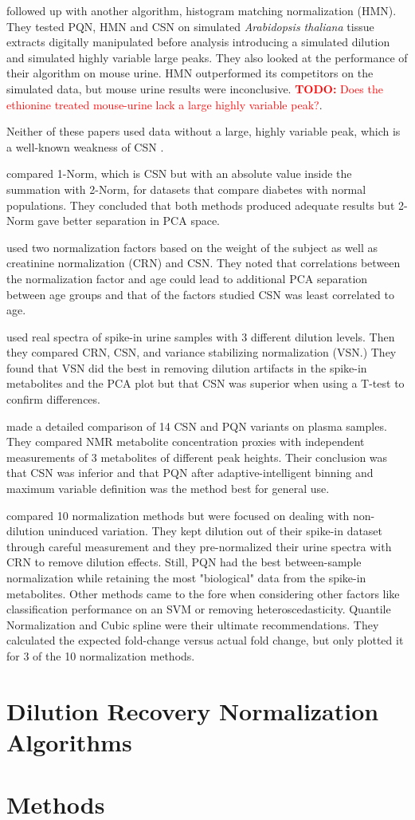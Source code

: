 \documentclass[english]{article}
\newcommand{\todo}[1]{\textcolor{red}{\textbf{TODO:} #1}}
\begin{document}
\citep{Torgrip2008} followed up with another algorithm, histogram matching normalization (HMN). They tested PQN, HMN and CSN on simulated \textit{Arabidopsis thaliana} tissue extracts digitally manipulated before analysis introducing a simulated dilution and simulated highly variable large peaks. They also looked at the performance of their algorithm on mouse urine. HMN outperformed its competitors on the simulated data, but mouse urine results were inconclusive. \todo{Does the ethionine treated mouse-urine lack a large highly variable peak?}.

Neither of these papers used data without a large, highly variable peak, which is a well-known weakness of CSN \citep{VanDenBerg2006}.

\citep{Wen2007} compared 1-Norm, which is CSN but with an absolute value inside the summation with 2-Norm, for datasets that compare diabetes with normal populations. They concluded that both methods produced adequate results but 2-Norm gave better separation in PCA space.

\citep{Schnackenberg2007} used two normalization factors based on the weight of the subject as well as creatinine normalization (CRN) and CSN. They noted that correlations between the normalization factor and age could lead to additional PCA separation between age groups and that of the factors studied CSN was least correlated to age.

\citep{Zhang2009a} used real spectra of spike-in urine samples with 3 different dilution levels. Then they compared CRN, CSN, and variance stabilizing normalization (VSN.) They found that VSN did the best in removing dilution artifacts in the spike-in metabolites and the PCA plot but that CSN was superior when using a T-test to confirm differences.

\citep{DeMeyer2010a} made a detailed comparison of 14 CSN and PQN variants on plasma samples. They compared NMR metabolite concentration proxies with independent measurements of 3 metabolites of different peak heights. Their conclusion was that CSN was inferior and that PQN after adaptive-intelligent binning and maximum variable definition was the method best for general use.

\citep{Kohl2012} compared 10 normalization methods but were focused on dealing with non-dilution uninduced variation. They kept dilution out of their spike-in dataset through careful measurement and they pre-normalized their urine spectra with CRN to remove dilution effects. Still, PQN had the best between-sample normalization while retaining the most "biological" data from the spike-in metabolites. Other methods came to the fore when considering other factors like classification performance on an SVM or removing heteroscedasticity. Quantile Normalization and Cubic spline were their ultimate recommendations. They calculated the expected fold-change versus actual fold change, but only plotted it for 3 of the 10 normalization methods.

\section{Dilution Recovery Normalization Algorithms}
\section{Methods}



\end{document}
